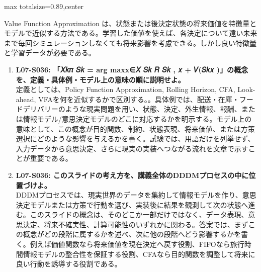 \begin{minipage}[t]{0.58\textwidth}
\begin{adjustbox}{max totalsize={\textwidth}{0.89\textheight},center}
\begin{minipage}{\textwidth}
Value Function Approximation は、状態または後決定状態の将来価値を特徴量とモデルで近似する方法である。学習した価値を使えば、各決定について遠い未来まで毎回シミュレーションしなくても将来影響を考慮できる。しかし良い特徴量と学習データが必要である。\par{}\begin{enumerate}\item \textbf{L07-S036: 「𝑋𝑘𝜋 𝑆𝑘 = arg maxx∈𝑋 𝑆𝑘 𝑅 𝑆𝑘 , 𝑥 + 𝑉(𝑆𝑘𝑥 )」の概念を、定義・具体例・モデル上の意味の順に説明せよ。}\\定義としては、Policy Function Approximation, Rolling Horizon, CFA, Look-ahead, VFAを何を近似するかで区別する。。具体例では、配送・在庫・フードデリバリーのような現実問題を用い、状態、決定、外生情報、報酬、または情報モデル/意思決定モデルのどこに対応するかを明示する。モデル上の意味として、この概念が目的関数、制約、状態表現、将来価値、または方策選択にどのような影響を与えるかを書く。試験では、用語だけを列挙せず、入力データから意思決定、さらに現実の実装へつながる流れを文章で示すことが重要である。\item \textbf{L07-S036: このスライドの考え方を、講義全体のDDDMプロセスの中に位置づけよ。}\\DDDMプロセスでは、現実世界のデータを集約して情報モデルを作り、意思決定モデルまたは方策で行動を選び、実装後に結果を観測して次の状態へ進む。このスライドの概念は、そのどこか一部だけではなく、データ表現、意思決定、将来不確実性、計算可能性のいずれかに関わる。答案では、まずこの概念がどの段階に属するかを述べ、次に他の段階へどう影響するかを書く。例えば価値関数なら将来価値を現在決定へ戻す役割、FIFOなら旅行時間情報モデルの整合性を保証する役割、CFAなら目的関数を調整して将来に良い行動を誘導する役割である。\end{enumerate}
\end{minipage}
\end{adjustbox}
\end{minipage}


